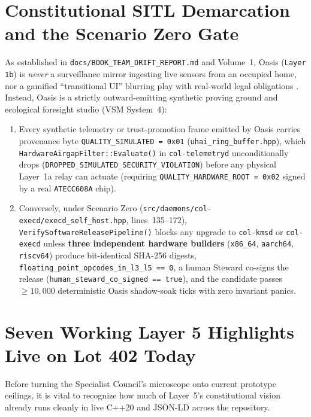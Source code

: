 \section{Constitutional SITL Demarcation and the Scenario Zero Gate}
\label{sec:ch8-sitl-demarcation}

As established in \texttt{docs/BOOK\_TEAM\_DRIFT\_REPORT.md} and Volume~1, Oasis
(\texttt{Layer 1b}) is \textit{never} a surveillance mirror ingesting live sensors from an
occupied home, nor a gamified ``transitional UI'' blurring play with real-world legal obligations
\parencite{zuboff2019}. Instead, Oasis is a strictly outward-emitting synthetic proving ground
and ecological foresight studio (VSM System~4):
\begin{enumerate}
\item Every synthetic telemetry or trust-promotion frame emitted by Oasis carries provenance
        byte \texttt{QUALITY\_SIMULATED = 0x01} (\texttt{uhai\_ring\_buffer.hpp}), which
        \texttt{HardwareAirgapFilter::Evaluate()} in \texttt{col-telemetryd} unconditionally
        drops (\texttt{DROPPED\_SIMULATED\_SECURITY\_VIOLATION}) before any physical Layer~1a
        relay can actuate (requiring \texttt{QUALITY\_HARDWARE\_ROOT = 0x02} signed by a real
        \texttt{ATECC608A} chip).
\item Conversely, under Scenario Zero (\texttt{src/daemons/col-execd/execd\_self\_host.hpp},
        lines~135--172), \texttt{VerifySoftwareReleasePipeline()} blocks any upgrade to
        \texttt{col-kmsd} or \texttt{col-execd} unless \textbf{three independent hardware
        builders} (\texttt{x86\_64}, \texttt{aarch64}, \texttt{riscv64}) produce bit-identical
        SHA-256 digests, \texttt{floating\_point\_opcodes\_in\_l3\_l5 == 0}, a human Steward
        co-signs the release (\texttt{human\_steward\_co\_signed == true}), and the candidate
        passes $\ge 10{,}000$ deterministic Oasis shadow-soak ticks with zero invariant panics.
\end{enumerate}

\section{Seven Working Layer 5 Highlights Live on Lot 402 Today}
\label{sec:ch8-working-highlights}

Before turning the Specialist Council's microscope onto current prototype ceilings, it is vital
to recognize how much of Layer~5's constitutional vision already runs cleanly in live C++20 and
JSON-LD across the repository.

